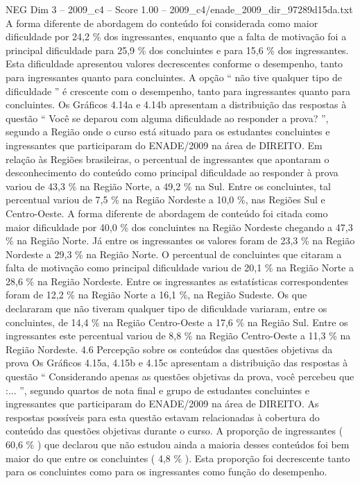 \begin{textsample}{NEG Dim 3 – 2009\_c4 – Score 1.00 – 2009\_c4/enade\_2009\_dir\_97289d15da.txt}
A forma diferente de abordagem do conteúdo foi considerada como maior dificuldade por 24,2 \% dos ingressantes, enquanto que a falta de motivação foi a principal dificuldade para 25,9 \% dos concluintes e para 15,6 \% dos ingressantes.
Esta dificuldade apresentou valores decrescentes conforme o desempenho, tanto para ingressantes quanto para concluintes.
A opção “ não tive qualquer tipo de dificuldade ” é crescente com o desempenho, tanto para ingressantes quanto para concluintes.
Os Gráficos 4.14a e 4.14b apresentam a distribuição das respostas à questão “ Você se deparou com alguma dificuldade ao responder a prova? ”, segundo a Região onde o curso está situado para os estudantes concluintes e ingressantes que participaram do ENADE/2009 na área de DIREITO.
Em relação às Regiões brasileiras, o percentual de ingressantes que apontaram o desconhecimento do conteúdo como principal dificuldade ao responder à prova variou de 43,3 \% na Região Norte, a 49,2 \% na Sul.
Entre os concluintes, tal percentual variou de 7,5 \% na Região Nordeste a 10,0 \%, nas Regiões Sul e Centro-Oeste.
A forma diferente de abordagem de conteúdo foi citada como maior dificuldade por 40,0 \% dos concluintes na Região Nordeste chegando a 47,3 \% na Região Norte.
Já entre os ingressantes os valores foram de 23,3 \% na Região Nordeste a 29,3 \% na Região Norte.
O percentual de concluintes que citaram a falta de motivação como principal dificuldade variou de 20,1 \% na Região Norte a 28,6 \% na Região Nordeste.
Entre os ingressantes as estatísticas correspondentes foram de 12,2 \% na Região Norte a 16,1 \%, na Região Sudeste.
Os que declararam que não tiveram qualquer tipo de dificuldade variaram, entre os concluintes, de 14,4 \% na Região Centro-Oeste a 17,6 \% na Região Sul.
Entre os ingressantes este percentual variou de 8,8 \% na Região Centro-Oeste a 11,3 \% na Região Nordeste. 4.6 Percepção sobre os conteúdos das questões objetivas da prova Os Gráficos 4.15a, 4.15b e 4.15c apresentam a distribuição das respostas à questão “ Considerando apenas as questões objetivas da prova, você percebeu que :... ”, segundo quartos de nota final e grupo de estudantes concluintes e ingressantes que participaram do ENADE/2009 na área de DIREITO.
As respostas possíveis para esta questão estavam relacionadas à cobertura do conteúdo das questões objetivas durante o curso.
A proporção de ingressantes ( 60,6 \% ) que declarou que não estudou ainda a maioria desses conteúdos foi bem maior do que entre os concluintes ( 4,8 \% ).
Esta proporção foi decrescente tanto para os concluintes como para os ingressantes como função do desempenho.

\end{textsample}
